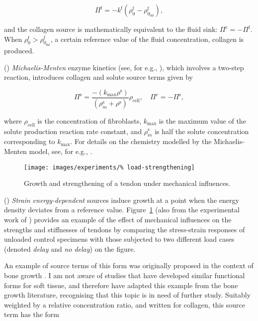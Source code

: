 \begin{equation}
\Pi^\mathrm{f} = -k^\mathrm{f}(\rho_0^\mathrm{f} -
\rho_{0_\mathrm{ini}}^\mathrm{f}),
\label{first-order-chemical-kinetics-source}
\end{equation}

\noindent and the collagen source is mathematically equivalent to the
fluid sink: $\Pi^\mathrm{c} = -\Pi^\mathrm{f}$. When
$\rho_{0}^\mathrm{f} > \rho_{0_\mathrm{ini}}^\mathrm{f}$, a certain
reference value of the fluid concentration, collagen is produced.

() {\em Michaelis-Menten} enzyme kinetics (see, for
e.g., \cite{Sengersetal:2004}), which involves a two-step reaction, 
introduces collagen and solute source terms given by

\begin{equation}
\Pi^\mathrm{s} =
    \frac{-(k_{\mathrm{max}}\rho^{\mathrm{s}})}
    {(\rho^{\mathrm{s}}_m+\rho^{\mathrm{s}})}
    \rho_{\mathrm{cell}}, \quad\Pi^\mathrm{c} = -\Pi^\mathrm{s},
\label{enzyme-kinetics-source}
\end{equation}

\noindent where $\rho_{\mathrm{cell}}$ is the concentration of
fibroblasts, $k_{\mathrm{max}}$ is the maximum value of the solute
production reaction rate constant, and $\rho^{\mathrm{s}}_m$ is half
the solute concentration corresponding to $k_{\mathrm{max}}$. For
details on the chemistry modelled by the Michaelis-Menten model, see,
for e.g., \citet{sbromadill}.

\begin{figure}
  \centering
  \texttt{[image: images/experiments/\%
    load-strengthening]}
  \caption{Growth and strengthening of a tendon under mechanical
    influences.}
  \label{load-strengthening}
\end{figure}

() {\em Strain energy-dependent} sources induce growth
at a point when the energy density deviates from a reference
value. Figure~\ref{load-strengthening} (also from the experimental
work of \citet{calveetal:07}) provides an example of the effect of
mechanical influences on the strengths and stiffnesses of tendons by
comparing the stress-strain responses of unloaded control specimens
with those subjected to two different load cases (denoted {\em delay}
and {\em no delay}) on the figure.

An example of source terms of this form was originally proposed in the
context of bone growth \citep{HarriganHamilton:93}. I am not aware of
studies that have developed similar functional forms for soft tissue,
and therefore have adapted this example from the bone growth
literature, recognising that this topic is in need of further
study. Suitably weighted by a relative concentration ratio, and
written for collagen, this source term has the form

